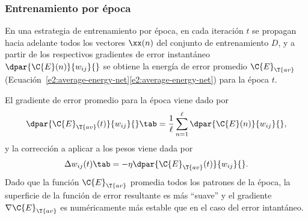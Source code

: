 %
\subsubsection{Entrenamiento por época}
%
En una estrategia de entrenamiento por época, en cada iteración $t$
se propagan hacia adelante todos los vectores $\xx(n)$ del conjunto
de entrenamiento $D$, y a partir de los respectivos
gradientes de error instantáneo $\dpar{\C{E}(n)}{w_{ij}}{}$
se obtiene la energía de error promedio $\C{E}_{\T{av}}$
(\iflatexml{}Ecuación~\ref{e2:average-energy-net}\else\autoref{e2:average-energy-net}\fi)
para la época $t$.

El gradiente de error promedio para la época viene dado por
%
\begin{align}\label{e2:deriv-Eav-wrt-w}
  \dpar{\C{E}_{\T{av}}(t)}{w_{ij}}{}\tab=
  \frac{1}{\ell}\sum_{n=1}^\ell\dpar{\C{E}(n)}{w_{ij}}{},
\end{align}
%
y la corrección a aplicar a los pesos viene dada por
%
\begin{align}\label{e2:delta-rule-epoch}
  \Delta w_{ij}(t)\tab=-\eta\dpar{\C{E}_{\T{av}}(t)}{w_{ij}}{}.
\end{align}
%
Dado que la función $\C{E}_{\T{av}}$ promedia todos los patrones de la
época, la superficie de la función de error resultante es más
``suave'' y el gradiente $\nabla\C{E}_{\T{av}}$ es numéricamente más
estable que en el caso del error intantáneo.
